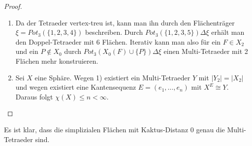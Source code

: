 \documentclass[12pt,titlepage,twoside,cleardoublepage]{article}
\theoremstyle{nummermitklammern}
\numberwithin{equation}{section}
\begin{document}
\begin{proof}
\begin{enumerate}
\item Da der Tetraeder vertex-treu ist, kann man ihn durch den Flächenträger $\xi =Pot_3(\{1,2,3,4\})$ beschreiben. Durch $Pot_3(\{1,2,3,5\})\Delta \xi$ erhält man den Doppel-Tetraeder mit 6 Flächen. Iterativ kann man also für ein $F\in X_2$ und ein $P\notin X_0$ durch $Pot_3(X_0(F)\cup \{P\})\Delta \xi$ einen Multi-Tetraeder mit 2 Flächen mehr konstruieren.
\begin{comment}
\item Man führt den Beweis per vollständiger Induktion.
Für $n=4$ hat man den Tetraeder als Multi-Tetraeder. Man nimmt nun an, es gibt Multi-Tetraeder $X$ mit $\vert X_2\vert=n$ und will nun die Existenz eines Multi-Tetraeders $Y$ mit $\vert Y_2\vert =n+2$ nachweisen.Da Multi-Tetraeder vertex-treu sind existiert ein Flächenträger $\zeta \subseteq \{1,\ldots,\vert X_0\vert\}$. Man definiert nun den Flächenträger eines Tetraeders $\xi:=Pot_3(\{\vert X_0\vert +1\}\cup A)$ für ein $A\in \zeta.$ Dann ist $\zeta \Delta \xi$ der Flächenträgers des Multi Tetraeders $\mathcal{S}(\zeta \Delta \xi)$ vom Typ $(a_0+1,\ldots,a_k)$ oder $(1,a_0,\ldots,a_k)$, wobei $(a_0+1,\ldots,a_k)$ der Typ von $X$ ist. Die Flächenanzahl von $Y$ ist
\[
\vert Y_2 \vert=\vert X_2 \vert+4-2=n+2.
\]
\end{comment}
\item
Sei $X$ eine Sphäre. Wegen 1) existiert ein Multi-Tetraeder $Y$ mit $\vert Y_2\vert =\vert X_2\vert $ und wegen  existiert eine Kantensequenz $E=(e_1,\ldots,e_n)$ mit $X^E\cong Y$. Daraus folgt $\chi(X)\leq n<\infty.$ 


\end{enumerate}
\end{proof}
Es ist klar, dass die simplizialen Flächen mit Kaktus-Distanz $0$ genau die Multi-Tetraeder sind. 
\end{document}
